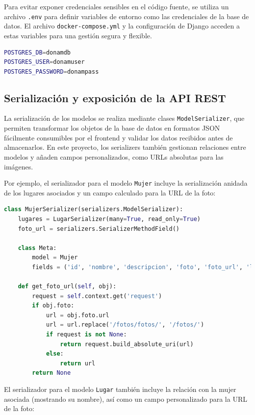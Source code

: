 Para evitar exponer credenciales sensibles en el código fuente, se utiliza un archivo \texttt{.env} para definir variables de entorno como las credenciales de la base de datos. El archivo \texttt{docker-compose.yml} y la configuración de Django acceden a estas variables para una gestión segura y flexible.

\begin{lstlisting}[language=bash, caption={Archivo .env}]
POSTGRES_DB=donamdb
POSTGRES_USER=donamuser
POSTGRES_PASSWORD=donampass
\end{lstlisting}

\subsection{Serialización y exposición de la API REST}

La serialización de los modelos se realiza mediante clases \texttt{ModelSerializer}, que permiten transformar los objetos de la base de datos en formatos JSON fácilmente consumibles por el frontend y validar los datos recibidos antes de almacenarlos. En este proyecto, los serializers también gestionan relaciones entre modelos y añaden campos personalizados, como URLs absolutas para las imágenes.

Por ejemplo, el serializador para el modelo \texttt{Mujer} incluye la serialización anidada de los lugares asociados y un campo calculado para la URL de la foto:

\begin{lstlisting}[language=Python, caption={Serializador Mujer}]
class MujerSerializer(serializers.ModelSerializer):
    lugares = LugarSerializer(many=True, read_only=True)
    foto_url = serializers.SerializerMethodField()

    class Meta:
        model = Mujer
        fields = ('id', 'nombre', 'descripcion', 'foto', 'foto_url', 'lugares', 'areas_investigacion')

    def get_foto_url(self, obj):
        request = self.context.get('request')
        if obj.foto:
            url = obj.foto.url
            url = url.replace('/fotos/fotos/', '/fotos/')
            if request is not None:
                return request.build_absolute_uri(url)
            else:
                return url
        return None
\end{lstlisting}

El serializador para el modelo \texttt{Lugar} también incluye la relación con la mujer asociada (mostrando su nombre), así como un campo personalizado para la URL de la foto:

